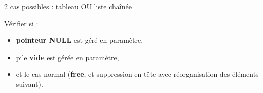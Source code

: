 \documentclass[11pt,a4paper]{article}
\begin{document}
\bigskip

\begin{center}

\vspace{2cm}

2 cas possibles : tableau OU liste chaînée

\bigskip

Vérifier si :
\begin{itemize}
\item \textbf{pointeur NULL} est géré en paramètre,
\item pile \textbf{vide} est gérée en paramètre,
\item et le cas normal (\textbf{free}, et suppression en tête avec réorganisation des éléments suivant).
\end{itemize}

\end{center}

\bigskip
\end{document}
